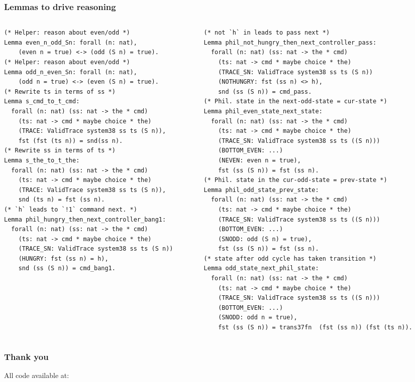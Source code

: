 \documentclass{beamer}
\begin{document}
\begin{frame}[fragile]
\frametitle{Lemmas to drive reasoning}

\begin{columns}[T] %
\begin{column}{.48\textwidth}
{\tiny
\begin{verbatim}
(* Helper: reason about even/odd *)
Lemma even_n_odd_Sn: forall (n: nat),
    (even n = true) <-> (odd (S n) = true).
(* Helper: reason about even/odd *)
Lemma odd_n_even_Sn: forall (n: nat),
    (odd n = true) <-> (even (S n) = true).
(* Rewrite ts in terms of ss *)
Lemma s_cmd_to_t_cmd: 
  forall (n: nat) (ss: nat -> the * cmd)
    (ts: nat -> cmd * maybe choice * the)
    (TRACE: ValidTrace system38 ss ts (S n)),
    fst (fst (ts n)) = snd(ss n).
(* Rewrite ss in terms of ts *)
Lemma s_the_to_t_the: 
  forall (n: nat) (ss: nat -> the * cmd)
    (ts: nat -> cmd * maybe choice * the)
    (TRACE: ValidTrace system38 ss ts (S n)),
    snd (ts n) = fst (ss n).
(* `h` leads to `!1` command next. *)
Lemma phil_hungry_then_next_controller_bang1:
  forall (n: nat) (ss: nat -> the * cmd)
    (ts: nat -> cmd * maybe choice * the)
    (TRACE_SN: ValidTrace system38 ss ts (S n))
    (HUNGRY: fst (ss n) = h),
    snd (ss (S n)) = cmd_bang1.
\end{verbatim}
}
\end{column}

\hfill
\begin{column}{.6\textwidth}
{\tiny
\begin{verbatim}
(* not `h` in leads to pass next *)
Lemma phil_not_hungry_then_next_controller_pass:
  forall (n: nat) (ss: nat -> the * cmd)
    (ts: nat -> cmd * maybe choice * the)
    (TRACE_SN: ValidTrace system38 ss ts (S n))
    (NOTHUNGRY: fst (ss n) <> h),
    snd (ss (S n)) = cmd_pass.
(* Phil. state in the next-odd-state = cur-state *)
Lemma phil_even_state_next_state:
  forall (n: nat) (ss: nat -> the * cmd)
    (ts: nat -> cmd * maybe choice * the)
    (TRACE_SN: ValidTrace system38 ss ts ((S n)))
    (BOTTOM_EVEN: ...)
    (NEVEN: even n = true),
    fst (ss (S n)) = fst (ss n).
(* Phil. state in the cur-odd-state = prev-state *)
Lemma phil_odd_state_prev_state:
  forall (n: nat) (ss: nat -> the * cmd)
    (ts: nat -> cmd * maybe choice * the)
    (TRACE_SN: ValidTrace system38 ss ts ((S n)))
    (BOTTOM_EVEN: ...)
    (SNODD: odd (S n) = true),
    fst (ss (S n)) = fst (ss n).
(* state after odd cycle has taken transition *)
Lemma odd_state_next_phil_state:
  forall (n: nat) (ss: nat -> the * cmd)
    (ts: nat -> cmd * maybe choice * the)
    (TRACE_SN: ValidTrace system38 ss ts ((S n)))
    (BOTTOM_EVEN: ...)
    (SNODD: odd n = true),
    fst (ss (S n)) = trans37fn  (fst (ss n)) (fst (ts n)). 
\end{verbatim}
}
\end{column}
\end{columns}
\end{frame}


\begin{frame}[fragile]
\frametitle{Thank you}
    All code available at:

    {\tiny
    }

\end{frame}
\end{document}
